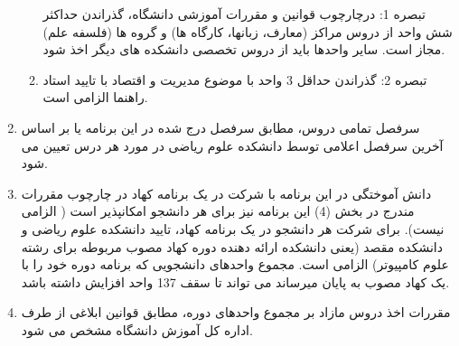 \documentclass{article}
\begin{document}
\begin{enumerate}
\begin{enumerate}
    تبصره 1: درچارچوب قوانین و مقررات آموزشی دانشگاه، گذراندن حداکثر شش واحد از دروس مراکز (معارف، زبانها، کارگاه ها) و گروه ها (فلسفه علم) مجاز است. سایر واحدها باید از دروس تخصصی دانشکده های دیگر اخذ شود.
    \item
    تبصره 2:  گذراندن حداقل 3 واحد با موضوع مدیریت و اقتصاد با تایید استاد راهنما الزامی است.
	\end{enumerate}
        \item
         سرفصل تمامی دروس، مطابق سرفصل درج شده در این برنامه یا بر اساس آخرین سرفصل اعلامی توسط دانشکده علوم ریاضی در مورد هر درس تعیین می شود.
        \item
         دانش آموختگی در این برنامه با شرکت در یک برنامه کهاد در چارچوب مقررات مندرج در بخش (4) این برنامه نیز برای هر دانشجو امکانپذیر است ( الزامی نیست). برای شرکت هر دانشجو در یک برنامه کهاد، تایید دانشکده علوم ریاضی و دانشکده مقصد (یعنی دانشکده ارائه دهنده دوره کهاد مصوب مربوطه برای رشته علوم کامپیوتر) الزامی است. مجموع واحدهای دانشجویی که برنامه دوره خود را با یک کهاد مصوب به پایان میرساند می تواند تا سقف 137 واحد افزایش داشته باشد.
        \item مقررات اخذ دروس مازاد بر مجموع واحدهای دوره، مطابق قوانین ابلاغی از طرف اداره کل آموزش دانشگاه مشخص می شود.
    \end{enumerate}
\end{document}

